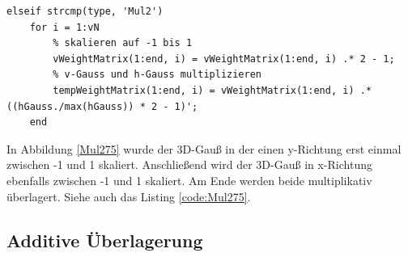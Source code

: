 \begin{lstlisting}[label=code:Mul275, caption=Auszug Matlab-Skript 'GetGaussWeights()']
elseif strcmp(type, 'Mul2')
	for i = 1:vN
		% skalieren auf -1 bis 1
		vWeightMatrix(1:end, i) = vWeightMatrix(1:end, i) .* 2 - 1;
		% v-Gauss und h-Gauss multiplizieren
		tempWeightMatrix(1:end, i) = vWeightMatrix(1:end, i) .* ((hGauss./max(hGauss)) * 2 - 1)';
	end
\end{lstlisting}

In Abbildung \ref{Mul275} wurde der 3D-Gauß in der einen y-Richtung erst einmal zwischen -1 und 1 skaliert. Anschließend wird der 3D-Gauß in x-Richtung ebenfalls zwischen -1 und 1 skaliert. Am Ende werden beide multiplikativ überlagert. Siehe auch das Listing \ref{code:Mul275}.

\newpage
\subsection{Additive Überlagerung}
